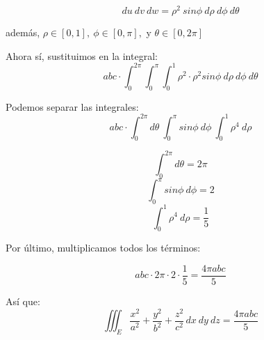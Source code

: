 $$du \ dv \ dw = \rho^2 \ sin \phi \ d\rho \ d\phi \ d\theta$$

además, $\rho \in [0, 1], \ \phi \in [0, \pi],$ y $\theta \in [0, 2\pi]$

Ahora sí, sustituimos en la integral:
$$abc \cdot \int_0^{2\pi} \int_0^{\pi} \int_0^1 \rho^2 \cdot \rho^2 sin\phi \ d\rho \ d\phi \ d\theta$$

Podemos separar las integrales:
$$abc \cdot \int_0^{2\pi} d\theta \ \int_0^{\pi} sin\phi \ d\phi \ \int_0^1 \rho^4 \ d\rho $$

$$\int_0^{2\pi} d\theta = 2\pi$$
$$\int_0^{\pi} sin\phi \ d\phi = 2$$
$$\int_0^1 \rho^4 \ d\rho = \frac{1}{5}$$

Por último, multiplicamos todos los términos:

$$abc \cdot 2\pi \cdot 2 \cdot \frac{1}{5} = \frac{4\pi abc}{5}$$

Así que:
$$\iiint_E \frac{x^2}{a^2} + \frac{y^2}{b^2} + \frac{z^2}{c^2}\, dx \ dy \ dz = \frac{4\pi abc}{5} $$
